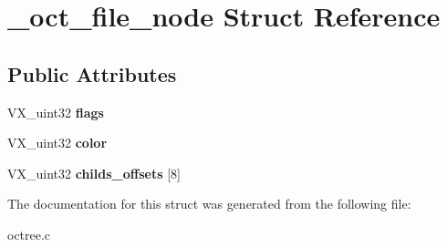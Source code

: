 \hypertarget{struct__oct__file__node}{\section{\-\_\-oct\-\_\-file\-\_\-node Struct Reference}
\label{struct__oct__file__node}
}
\subsection*{Public Attributes}
\begin{DoxyCompactItemize}
\item 
\hypertarget{struct__oct__file__node_a351d9c39ea3d6d39b98993c5516f2fb0}{V\-X\-\_\-uint32 {\bfseries flags}}\label{struct__oct__file__node_a351d9c39ea3d6d39b98993c5516f2fb0}

\item 
\hypertarget{struct__oct__file__node_a051cb61d96ffc20b89a6ad87c79e68f7}{V\-X\-\_\-uint32 {\bfseries color}}\label{struct__oct__file__node_a051cb61d96ffc20b89a6ad87c79e68f7}

\item 
\hypertarget{struct__oct__file__node_afbec406b337dd59333dfefb2d02f7472}{V\-X\-\_\-uint32 {\bfseries childs\-\_\-offsets} \mbox{[}8\mbox{]}}\label{struct__oct__file__node_afbec406b337dd59333dfefb2d02f7472}

\end{DoxyCompactItemize}


The documentation for this struct was generated from the following file\-:\begin{DoxyCompactItemize}
\item 
octree.\-c\end{DoxyCompactItemize}
